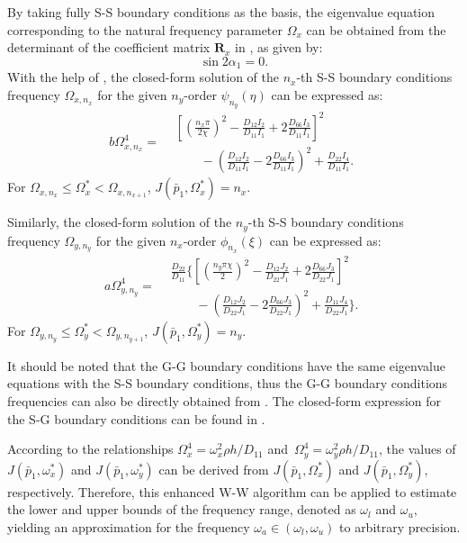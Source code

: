\documentclass[preprint,12pt,number]{elsarticle}
\begin{document}
By taking fully S-S boundary conditions as the basis, the eigenvalue equation corresponding to the natural frequency parameter $ \Omega_x $ can be obtained from the determinant of the coefficient matrix $ \mathbf{R}_x $ in , as given by:
%
\begin{equation}\label{eq:SSx} 
\sin 2\alpha_1 = 0.
\end{equation}
%
With the help of , the closed-form solution of the $n_x$-th S-S boundary conditions frequency $\Omega_{x,n_x}$ for the given $n_y$-order $\psi_{n_y}(\eta)$ can be expressed as:
%
\begin{equation}\label{eq:J_simpx}
b \Omega^4_{x,n_x} =
\begin{aligned}
	&\left[\left(\frac{n_x\pi}{2\chi}\right)^2 - \frac{D_{12}I_2}{D_{11}I_1} + 2 \frac{D_{66}I_3}{D_{11}I_1}\right]^2 \\
	&\qquad- \left(\frac{D_{12}I_2}{D_{11}I_1} - 2 \frac{D_{66}I_3}{D_{11}I_1}\right)^2
	+ \frac{D_{22}I_4}{D_{11}I_1}.
\end{aligned}
\end{equation}
%
For $\Omega_{x,n_x} \leq \Omega_x^* < \Omega_{x,n_{x+1}}$, $J(\bar{p}_1, \Omega_x^*) = n_x$.

Similarly, the closed-form solution of the $n_y$-th S-S boundary conditions frequency $\Omega_{y,n_y}$ for the given $n_x$-order $\phi_{n_x}(\xi)$ can be expressed as:
%
\begin{equation}\label{eq:J_simpy}
a\Omega^4_{y,n_y}= 
\begin{aligned}
	&\frac{D_{22}}{D_{11}}\Biggl\{\left[\left(\frac{n_y\pi\chi}{2}\right)^2 - \frac{D_{12}J_2}{D_{22}J_1} + 2 \frac{D_{66}J_3}{D_{22}J_1}\right]^2 \\ 
	&\qquad - \left(\frac{D_{12}J_2}{D_{22}J_1} - 2 \frac{D_{66}J_3}{D_{22}J_1}\right)^2
	+ \frac{D_{11}J_4}{D_{22}J_1}\Biggr\}.
\end{aligned}
\end{equation}
%
For $\Omega_{y,n_y} \leq \Omega_y^* < \Omega_{y,n_{y+1}}$, $J(\bar{p}_1, \Omega_y^*) = n_y$.

It should be noted that the G-G boundary conditions have the same eigenvalue equations with the S-S boundary conditions, thus the G-G boundary conditions frequencies can also be directly obtained from .
The closed-form expression for the S-G boundary conditions can be found in .

According to the relationships 
$\Omega^4_x = {{\omega_x^2 \rho h}/{D_{11}}}$ and\ $\Omega^4_y = {{\omega_y^2 \rho h}/{D_{11}}}$, 
the values of $J(\bar{p}_1, \omega_x^*)$ and $J(\bar{p}_1, \omega_y^*)$ can be derived from $J(\bar{p}_1, \Omega_x^*)$ and $J(\bar{p}_1, \Omega_y^*)$, respectively. 
Therefore, this enhanced W-W algorithm can be applied to estimate the lower and upper bounds of the frequency range, denoted as $\omega_l$ and $\omega_u$, yielding an approximation for the frequency $\omega_a \in (\omega_l, \omega_u)$ to arbitrary precision.
\end{document}
